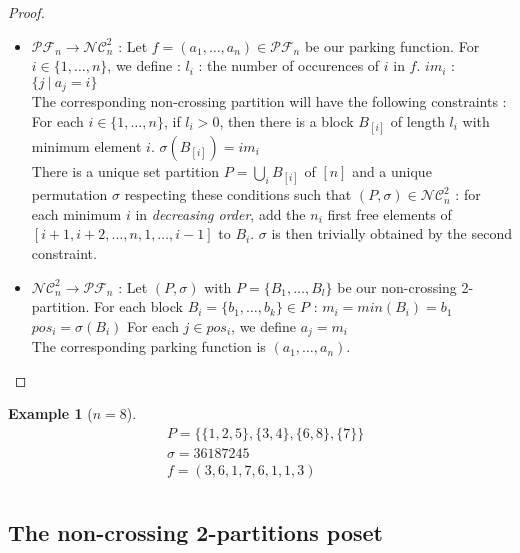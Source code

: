 \documentclass[12pt]{report}
\newtheorem*{example}{Example}
\begin{document}
\begin{proof}
    ~\\
\begin{itemize}
    \item $\mathcal{PF}_n \to \mathcal{NC}^2_n$ :
    Let $f = (a_1, \ldots, a_n) \in \mathcal{PF}_n$
    be our parking function.
    For $i \in \{1, \ldots, n\}$, we define :
        \subitem $l_i$ : the number of occurences of $i$ in $f$. 
        \subitem $im_i$ : $\{j\ |\ a_j = i\}$\\
    The corresponding non-crossing partition will
    have the following constraints :
        \subitem For each $i \in \{1, \ldots, n\}$, if $l_i > 0$,
        then there is a block $B_{[i]}$ of length
        \subitem $l_i$ with minimum element $i$.
        \subitem $\sigma (B_{[i]}) = im_i$\\
    There is a unique set partition
    $\displaystyle P = \bigcup_{i}{B}_{[i]}$ of $[n]$
    and a unique permutation $\sigma$ respecting these
    conditions such that $(P, \sigma) \in \mathcal{NC}^2_n$ :
    for each minimum $i$ in \emph{decreasing order}, add
    the $n_i$ first free elements of
    $[i+1, i+2, \ldots, n, 1, \ldots, i-1]$ to $B_i$.
    $\sigma$ is then trivially obtained by the second
    constraint. 
    \item $\mathcal{NC}^2_n \to \mathcal{PF}_n$ :
    Let $(P, \sigma)$ with $P = \{B_1, \ldots, B_l\}$ be our
    non-crossing 2-partition.
    For each block $B_i = \{b_1, \ldots, b_k\} \in P$ :
    \subitem $m_i = min (B_i) = b_1$
    \subitem $pos_i = \sigma (B_i)$
    \subitem For each $j \in pos_i$, we define $a_j = m_i$\\
    The corresponding parking function is $(a_1, \ldots, a_n)$.
\end{itemize}
\end{proof}

\begin{example}[$n = 8$]
    \begin{align*}
        &P = \{\{1, 2, 5\}, \{3, 4\}, \{6, 8\}, \{7\}\}\\
        &\sigma = 36187245\\
        &f = (3, 6, 1, 7, 6, 1, 1, 3)\\
    \end{align*}
\end{example}

\subsection{The non-crossing 2-partitions poset}
\end{document}

